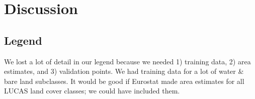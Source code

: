 \section{Discussion}

    \subsection{Legend}
        We lost a lot of detail in our legend because we needed 1) training data, 2) area estimates, and 3) validation points. We had training data for a lot of water \& bare land subclasses. It would be good if Eurostat made area estimates for all LUCAS land cover classes; we could have included them.